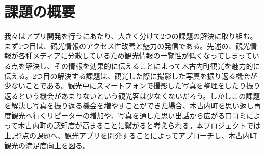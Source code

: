 \section{課題の概要}\label{sec:gaiyou}
我々はアプリ開発を行うにあたり、大きく分けて2つの課題の解決に取り組む。まず1つ目は、観光情報のアクセス性改善と魅力の発信である。先述の、観光情報が各種メディアに分散しているため観光情報の一覧性が低くなってしまっている点を解決し、その情報を効果的に伝えることによって木古内町観光を魅力的に伝える。2つ目の解決する課題は、観光した際に撮影した写真を振り返る機会が少ないことである。観光中にスマートフォンで撮影した写真を整理をしたり振り返るという機会があまりないという観光客は少なくないだろう。しかしこの課題を解決し写真を振り返る機会を増やすことができた場合、木古内町を思い返し再度観光へ行くリピーターの増加や、写真を通した思い出話から広がる口コミによって木古内町の認知度が高まることに繋がると考えられる。本プロジェクトでは上記2点の課題へ、観光アプリを開発することによってアプローチし、木古内町観光の満足度向上を図る。
